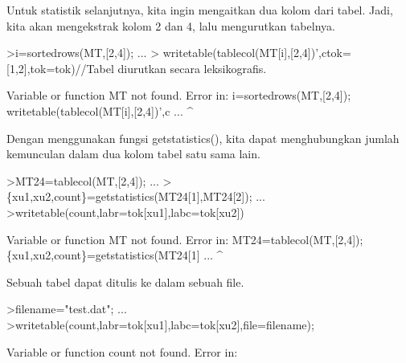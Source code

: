 \documentclass[12pt,arial,letterpaper]{book}
\begin{document}
\begin{eulercomment}
\begin{eulercomment}
\begin{eulercomment}
\begin{eulercomment}
\begin{eulercomment}
\begin{eulercomment}
\begin{eulercomment}
\begin{eulercomment}
\begin{eulercomment}
\begin{eulercomment}
\begin{eulercomment}
\begin{eulercomment}
\begin{eulercomment}
\begin{eulercomment}
\begin{eulercomment}
\begin{eulercomment}
\begin{eulercomment}
\begin{eulercomment}
\begin{eulercomment}
\begin{eulercomment}
\begin{eulercomment}
\begin{eulercomment}
\begin{eulercomment}
\begin{eulercomment}
\begin{eulercomment}
\begin{eulercomment}
\begin{eulercomment}
\begin{eulercomment}
\begin{eulercomment}
\begin{eulercomment}
\begin{eulercomment}
\begin{eulercomment}
\begin{euleroutput}
\end{euleroutput}
\begin{eulercomment}
Untuk statistik selanjutnya, kita ingin mengaitkan dua kolom dari
tabel. Jadi, kita akan mengekstrak kolom 2 dan 4, lalu mengurutkan
tabelnya.
\end{eulercomment}
\begin{eulerprompt}
>i=sortedrows(MT,[2,4]);  ...
>  writetable(tablecol(MT[i],[2,4])',ctok=[1,2],tok=tok)//Tabel diurutkan secara leksikografis.
\end{eulerprompt}
\begin{euleroutput}
  Variable or function MT not found.
  Error in:
  i=sortedrows(MT,[2,4]);    writetable(tablecol(MT[i],[2,4])',c ...
                 ^
\end{euleroutput}
\begin{eulercomment}
Dengan menggunakan fungsi getstatistics(), kita dapat menghubungkan
jumlah kemunculan dalam dua kolom tabel satu sama lain.
\end{eulercomment}
\begin{eulerprompt}
>MT24=tablecol(MT,[2,4]); ...
>\{xu1,xu2,count\}=getstatistics(MT24[1],MT24[2]); ...
>writetable(count,labr=tok[xu1],labc=tok[xu2])
\end{eulerprompt}
\begin{euleroutput}
  Variable or function MT not found.
  Error in:
  MT24=tablecol(MT,[2,4]); \{xu1,xu2,count\}=getstatistics(MT24[1] ...
                  ^
\end{euleroutput}
\begin{eulercomment}
Sebuah tabel dapat ditulis ke dalam sebuah file.
\end{eulercomment}
\begin{eulerprompt}
>filename="test.dat"; ...
>writetable(count,labr=tok[xu1],labc=tok[xu2],file=filename);
\end{eulerprompt}
\begin{euleroutput}
  Variable or function count not found.
  Error in:

\end{euleroutput}
\end{eulercomment}
\end{eulercomment}
\end{eulercomment}
\end{eulercomment}
\end{eulercomment}
\end{eulercomment}
\end{eulercomment}
\end{eulercomment}
\end{eulercomment}
\end{eulercomment}
\end{eulercomment}
\end{eulercomment}
\end{eulercomment}
\end{eulercomment}
\end{eulercomment}
\end{eulercomment}
\end{eulercomment}
\end{eulercomment}
\end{eulercomment}
\end{eulercomment}
\end{eulercomment}
\end{eulercomment}
\end{eulercomment}
\end{eulercomment}
\end{eulercomment}
\end{eulercomment}
\end{eulercomment}
\end{eulercomment}
\end{eulercomment}
\end{eulercomment}
\end{eulercomment}
\end{eulercomment}
\end{document}
